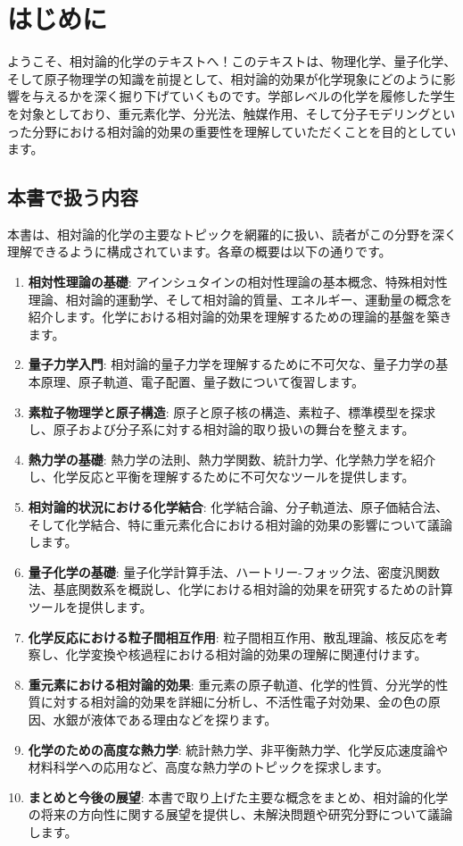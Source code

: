 \section{はじめに}

ようこそ、相対論的化学のテキストへ！このテキストは、物理化学、量子化学、そして原子物理学の知識を前提として、相対論的効果が化学現象にどのように影響を与えるかを深く掘り下げていくものです。学部レベルの化学を履修した学生を対象としており、重元素化学、分光法、触媒作用、そして分子モデリングといった分野における相対論的効果の重要性を理解していただくことを目的としています。

\subsection{本書で扱う内容}

本書は、相対論的化学の主要なトピックを網羅的に扱い、読者がこの分野を深く理解できるように構成されています。各章の概要は以下の通りです。

\begin{enumerate}
    \item \textbf{相対性理論の基礎}: アインシュタインの相対性理論の基本概念、特殊相対性理論、相対論的運動学、そして相対論的質量、エネルギー、運動量の概念を紹介します。化学における相対論的効果を理解するための理論的基盤を築きます。
    \item \textbf{量子力学入門}: 相対論的量子力学を理解するために不可欠な、量子力学の基本原理、原子軌道、電子配置、量子数について復習します。
    \item \textbf{素粒子物理学と原子構造}: 原子と原子核の構造、素粒子、標準模型を探求し、原子および分子系に対する相対論的取り扱いの舞台を整えます。
    \item \textbf{熱力学の基礎}: 熱力学の法則、熱力学関数、統計力学、化学熱力学を紹介し、化学反応と平衡を理解するために不可欠なツールを提供します。
    \item \textbf{相対論的状況における化学結合}: 化学結合論、分子軌道法、原子価結合法、そして化学結合、特に重元素化合における相対論的効果の影響について議論します。
    \item \textbf{量子化学の基礎}: 量子化学計算手法、ハートリー-フォック法、密度汎関数法、基底関数系を概説し、化学における相対論的効果を研究するための計算ツールを提供します。
    \item \textbf{化学反応における粒子間相互作用}: 粒子間相互作用、散乱理論、核反応を考察し、化学変換や核過程における相対論的効果の理解に関連付けます。
    \item \textbf{重元素における相対論的効果}: 重元素の原子軌道、化学的性質、分光学的性質に対する相対論的効果を詳細に分析し、不活性電子対効果、金の色の原因、水銀が液体である理由などを探ります。
    \item \textbf{化学のための高度な熱力学}: 統計熱力学、非平衡熱力学、化学反応速度論や材料科学への応用など、高度な熱力学のトピックを探求します。
    \item \textbf{まとめと今後の展望}: 本書で取り上げた主要な概念をまとめ、相対論的化学の将来の方向性に関する展望を提供し、未解決問題や研究分野について議論します。
\end{enumerate}

